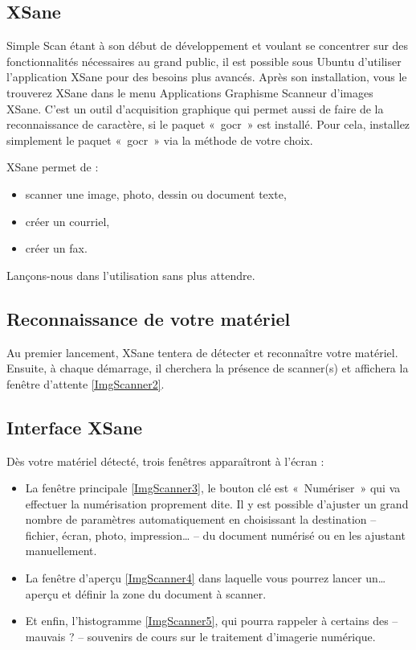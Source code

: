 \subsection{XSane}
Simple Scan étant à son début de développement et voulant se concentrer sur des fonctionnalités nécessaires au grand public, il est possible sous Ubuntu d'utiliser l'application XSane pour des besoins plus avancés. Après son installation, vous le trouverez XSane dans le menu  Applications \FlecheDroite Graphisme \FlecheDroite Scanneur d'images XSane. C'est un outil d'acquisition graphique qui permet aussi de faire de la reconnaissance de caractère, si le paquet «~gocr~» est installé. Pour cela, installez simplement le paquet «~gocr~» via la méthode de votre choix.\par
XSane permet de :
\begin{itemize}
\item scanner une image, photo, dessin ou document texte, 
\item créer un courriel, 
\item créer un fax. 
\end{itemize}
Lançons-nous dans l'utilisation sans plus attendre.
\subsection{Reconnaissance de votre matériel}
Au premier lancement, XSane tentera de détecter et reconnaître votre matériel. Ensuite, à chaque démarrage, il cherchera la présence de scanner(s) et affichera la fenêtre d'attente \ref{ImgScanner2}.
\subsection{Interface XSane}
Dès votre matériel détecté, trois fenêtres apparaîtront à l'écran : 
\ScannerPresentation
\begin{itemize}
\item La fenêtre principale \ref{ImgScanner3}, le bouton clé est «~Numériser~» qui va effectuer la numérisation proprement dite. Il y est possible d'ajuster un grand nombre de paramètres automatiquement en choisissant la destination -- fichier, écran, photo, impression\ldots{} -- du document numérisé ou en les ajustant manuellement.
\item La fenêtre d'aperçu \ref{ImgScanner4} dans laquelle vous pourrez lancer un\ldots{} aperçu et définir la zone du document à scanner.
\item Et enfin, l'histogramme \ref{ImgScanner5}, qui pourra rappeler à certains des -- mauvais ? -- souvenirs de cours sur le traitement d'imagerie numérique.
\end{itemize}
